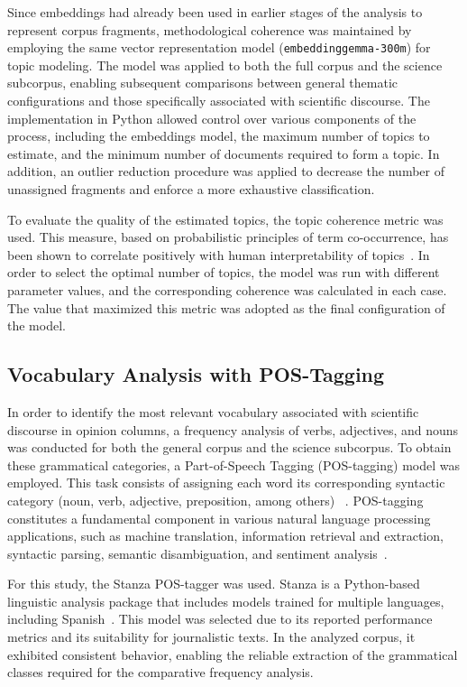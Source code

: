 \documentclass[pdflatex,sn-mathphys-num,iicol]{sn-jnl}
\begin{document}
	
	
	Since embeddings had already been used in earlier stages of the analysis to represent corpus fragments, methodological coherence was maintained by employing the same vector representation model (\texttt{embeddinggemma-300m}) for topic modeling. The model was applied to both the full corpus and the science subcorpus, enabling subsequent comparisons between general thematic configurations and those specifically associated with scientific discourse. The implementation in Python allowed control over various components of the process, including the embeddings model, the maximum number of topics to estimate, and the minimum number of documents required to form a topic. In addition, an outlier reduction procedure was applied to decrease the number of unassigned fragments and enforce a more exhaustive classification.
	
	To evaluate the quality of the estimated topics, the topic coherence metric was used. This measure, based on probabilistic principles of term co-occurrence, has been shown to correlate positively with human interpretability of topics~\cite{Rder2015}. In order to select the optimal number of topics, the model was run with different parameter values, and the corresponding coherence was calculated in each case. The value that maximized this metric was adopted as the final configuration of the model.

	
	\subsection{Vocabulary Analysis with POS-Tagging}\label{subsec:pos}
	
	In order to identify the most relevant vocabulary associated with scientific discourse in opinion columns, a frequency analysis of verbs, adjectives, and nouns was conducted for both the general corpus and the science subcorpus. To obtain these grammatical categories, a Part-of-Speech Tagging (POS-tagging) model was employed. This task consists of assigning each word its corresponding syntactic category (noun, verb, adjective, preposition, among others) ~\cite{he2020surveyrecentadvancessequence}. POS-tagging constitutes a fundamental component in various natural language processing applications, such as machine translation, information retrieval and extraction, syntactic parsing, semantic disambiguation, and sentiment analysis~\cite{Chiche2022}.
	
	For this study, the Stanza POS-tagger was used. Stanza is a Python-based linguistic analysis package that includes models trained for multiple languages, including Spanish~\cite{qi2020stanza}. This model was selected due to its reported performance metrics and its suitability for journalistic texts. In the analyzed corpus, it exhibited consistent behavior, enabling the reliable extraction of the grammatical classes required for the comparative frequency analysis.
	
\end{document}
